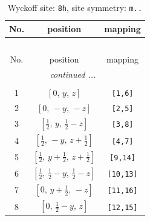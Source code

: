 \documentclass[fleqn,8pt]{jsarticle}
\begin{document}
\begin{longtable}{ccc}
\caption{Wyckoff site: {\tt 8h}, site symmetry: {\tt m..}}
 \\
 \hline \hline
No. & position & mapping \\ \hline \endfirsthead

\multicolumn{2}{l}{\tablename\ \thetable{}} \\
 \hline \hline
No. & position & mapping \\ \hline \endhead

 \hline \hline
\multicolumn{2}{r}{\footnotesize\it continued ...} \\ \endfoot

 \hline \hline
\multicolumn{2}{r}{} \\ \endlastfoot

1 & $\left[ 0,\, y,\, z \right]$ & {\tt [1,6]} \\ \hline
2 & $\left[ 0,\, - y,\, - z \right]$ & {\tt [2,5]} \\ \hline
3 & $\left[ \frac{1}{2},\, y,\, \frac{1}{2} - z \right]$ & {\tt [3,8]} \\ \hline
4 & $\left[ \frac{1}{2},\, - y,\, z + \frac{1}{2} \right]$ & {\tt [4,7]} \\ \hline
5 & $\left[ \frac{1}{2},\, y + \frac{1}{2},\, z + \frac{1}{2} \right]$ & {\tt [9,14]} \\ \hline
6 & $\left[ \frac{1}{2},\, \frac{1}{2} - y,\, \frac{1}{2} - z \right]$ & {\tt [10,13]} \\ \hline
7 & $\left[ 0,\, y + \frac{1}{2},\, - z \right]$ & {\tt [11,16]} \\ \hline
8 & $\left[ 0,\, \frac{1}{2} - y,\, z \right]$ & {\tt [12,15]} \\
\end{longtable}
\renewcommand{\arraystretch}{1.2}
\end{document}
